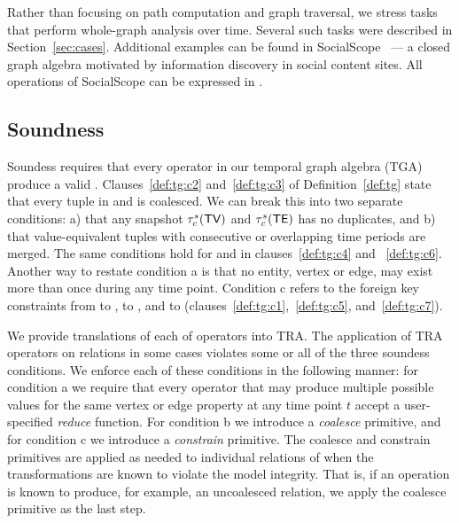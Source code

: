 Rather than focusing on path computation and graph traversal, we
stress tasks that perform whole-graph analysis over time.  Several
such tasks were described in Section~\ref{sec:cases}.  Additional
examples can be found in SocialScope~\cite{Amer-Yahia2009} --- a
closed graph algebra motivated by information discovery in social
content sites.  All operations of SocialScope can be expressed in
\ql. 

\subsection{Soundness}
\label{sec:algebra:integrity}


Soundess requires that every operator in our temporal graph algebra
(TGA) produce a valid \tg.  Clauses~\ref{def:tg:c2}
and~\ref{def:tg:c3} of Definition~\ref{def:tg} state that every tuple
in \tv and \te is coalesced.  We can break this into two separate
conditions: a) that any snapshot $\tau^s_c (\textsf{TV})$ and $\tau^s_c (\textsf{TE})$
has no duplicates, and b) that value-equivalent tuples with
consecutive or overlapping time periods are merged.  The same
conditions hold for \tav and \tae in clauses~\ref{def:tg:c4} and
~\ref{def:tg:c6}.  Another way to restate condition a is that no
entity, vertex or edge, may exist more than once during any time
point.  Condition c refers to the foreign key constraints from \tav to
\tv, \tae to \te, and \te to \tv
(clauses~\ref{def:tg:c1},~\ref{def:tg:c5}, and~\ref{def:tg:c7}).

We provide translations of each of \ql operators into TRA.  The
application of TRA operators on \tve relations in some cases violates
some or all of the three soundess conditions.  We enforce each of
these conditions in the following manner: for condition a we require
that every operator that may produce multiple possible values for the
same vertex or edge property at any time point $t$ accept a
user-specified {\em reduce} function. For condition b we introduce a
{\em coalesce} primitive, and for condition c we introduce a {\em
  constrain} primitive.  The coalesce and constrain primitives are
applied as needed to individual relations of \tve when the
transformations are known to violate the model integrity.  That is, if
an operation is known to produce, for example, an uncoalesced
relation, we apply the coalesce primitive as the last step.

